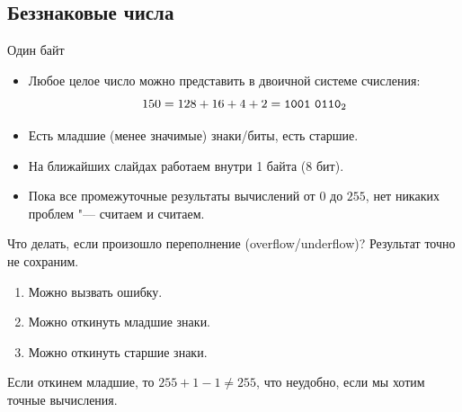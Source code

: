 \subsection{Беззнаковые числа}

\begin{frame}
\end{frame}

\begin{frame}[t]{Один байт}
	\begin{itemize}
		\item
			Любое целое число можно представить в двоичной системе счисления:
			\[ 150 = 128 + 16 + 4 + 2 = \t{1001~0110}_2 \]
		\item
			Есть младшие (менее значимые) знаки/биты, есть старшие.
		\item
			На ближайших слайдах работаем внутри 1 байта (8 бит).
		\item
			Пока все промежуточные результаты вычислений от $0$ до $255$, нет никаких проблем "--- считаем и считаем.
	\end{itemize}
	Что делать, если произошло переполнение (overflow/underflow)?
	Результат точно не сохраним.
	\begin{enumerate}
		\item Можно вызвать ошибку.
		\item Можно откинуть младшие знаки.
		\item Можно откинуть старшие знаки.
	\end{enumerate}
	Если откинем младшие, то $255+1-1\neq 255$, что неудобно, если мы хотим точные вычисления.
\end{frame}

